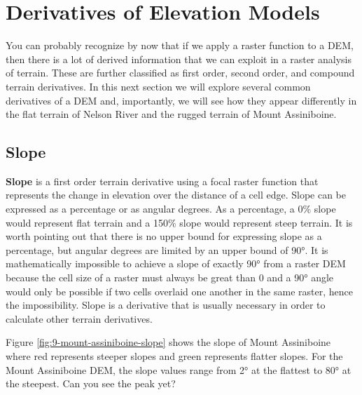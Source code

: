 \documentclass[
]{book}
\begin{document}
\hypertarget{derivatives-of-elevation-models}{%
\section{Derivatives of Elevation Models}\label{derivatives-of-elevation-models}}

You can probably recognize by now that if we apply a raster function to a DEM, then there is a lot of derived information that we can exploit in a raster analysis of terrain. These are further classified as first order, second order, and compound terrain derivatives. In this next section we will explore several common derivatives of a DEM and, importantly, we will see how they appear differently in the flat terrain of Nelson River and the rugged terrain of Mount Assiniboine.

\hypertarget{slope}{%
\subsection{Slope}\label{slope}}

\textbf{Slope} is a first order terrain derivative using a focal raster function that represents the change in elevation over the distance of a cell edge. Slope can be expressed as a percentage or as angular degrees. As a percentage, a 0\% slope would represent flat terrain and a 150\% slope would represent steep terrain. It is worth pointing out that there is no upper bound for expressing slope as a percentage, but angular degrees are limited by an upper bound of 90°. It is mathematically impossible to achieve a slope of exactly 90° from a raster DEM because the cell size of a raster must always be great than 0 and a 90° angle would only be possible if two cells overlaid one another in the same raster, hence the impossibility. Slope is a derivative that is usually necessary in order to calculate other terrain derivatives.

Figure \ref{fig:9-mount-assiniboine-slope} shows the slope of Mount Assiniboine where red represents steeper slopes and green represents flatter slopes. For the Mount Assiniboine DEM, the slope values range from 2° at the flattest to 80° at the steepest. Can you see the peak yet?
\end{document}
